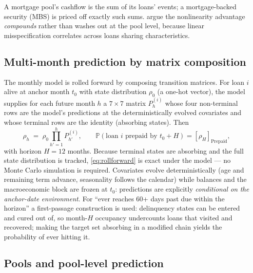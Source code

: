 A mortgage pool's cashflow is the sum of its loans' events; a
mortgage-backed security (MBS) is priced off exactly such sums.
\citet{sirignano2021} argue the nonlinearity advantage
\emph{compounds} rather than washes out at the pool level, because
linear misspecification correlates across loans sharing
characteristics.

\subsection{Multi-month prediction by matrix composition}
\label{subsec:meth-rollforward}

The monthly model is rolled forward by composing transition
matrices.  For loan $i$ alive at anchor month $t_0$ with state
distribution $\rho_0$ (a one-hot vector), the model supplies for each
future month $h$ a $7\times 7$ matrix $P^{(i)}_h$ whose four
non-terminal rows are the model's predictions at the
deterministically evolved covariates and whose terminal rows are the
identity (absorbing states).  Then
\begin{equation}
\label{eq:rollforward}
\rho_h \;=\; \rho_0 \prod_{h'=1}^{h} P^{(i)}_{h'},
\qquad
\mathbb{P}\!\left(\text{loan } i \text{ prepaid by } t_0{+}H\right)
= \left[\rho_H\right]_{\mathrm{Prepaid}},
\end{equation}
with horizon $H=12$ months.  Because terminal states are absorbing
and the full state distribution is tracked,
\eqref{eq:rollforward} is exact under the model --- no Monte Carlo
simulation is required.  Covariates evolve deterministically (age and
remaining term advance, seasonality follows the calendar) while
balances and the macroeconomic block are frozen at $t_0$: predictions
are explicitly \emph{conditional on the anchor-date environment}.
For ``ever reaches 60+ days past due within the horizon'' a
first-passage construction is used: delinquency states can be entered
and cured out of, so month-$H$ occupancy undercounts loans that
visited and recovered; making the target set absorbing in a modified
chain yields the probability of ever hitting it.

\subsection{Pools and pool-level prediction}
\label{subsec:meth-pools}

